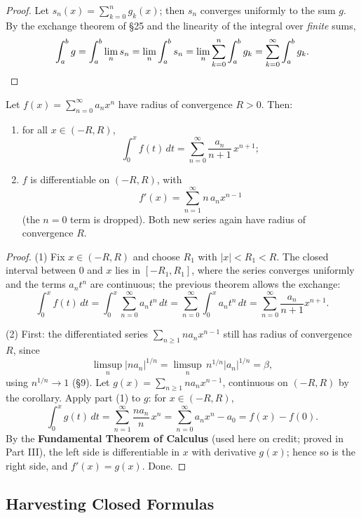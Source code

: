 \documentclass[11pt]{report}
\begin{document}
\begin{proof}
Let $s_n(x) = \sum_{k=0}^n g_k(x)$; then $s_n$ converges uniformly to the sum $g$. By the exchange theorem of \S 25 and the linearity of the integral over \emph{finite} sums,
\[
\int_a^b g = \int_a^b \lim_n s_n = \lim_n \int_a^b s_n = \lim_n \sum_{k=0}^n \int_a^b g_k = \sum_{k=0}^\infty \int_a^b g_k. \qedhere
\]
\end{proof}

\begin{thmbox}
Let $f(x) = \sum_{n=0}^\infty a_n x^n$ have radius of convergence $R > 0$. Then:
\begin{enumerate}[label=(\arabic*)]
    \item for all $x \in (-R, R)$,
    \[
    \int_0^x f(t)\,dt = \sum_{n=0}^\infty \frac{a_n}{n+1}\, x^{n+1};
    \]
    \item $f$ is differentiable on $(-R,R)$, with
    \[
    f'(x) = \sum_{n=1}^\infty n\, a_n x^{n-1}
    \]
    (the $n = 0$ term is dropped). Both new series again have radius of convergence $R$.
\end{enumerate}
\end{thmbox}

\begin{proof}
(1) Fix $x \in (-R,R)$ and choose $R_1$ with $|x| < R_1 < R$. The closed interval between $0$ and $x$ lies in $[-R_1, R_1]$, where the series converges uniformly and the terms $a_n t^n$ are continuous; the previous theorem allows the exchange:
\[
\int_0^x f(t)\,dt = \int_0^x \sum_{n=0}^\infty a_n t^n\,dt = \sum_{n=0}^\infty \int_0^x a_n t^n\,dt = \sum_{n=0}^\infty \frac{a_n}{n+1} x^{n+1}.
\]

(2) First: the differentiated series $\sum_{n\geq1} n a_n x^{n-1}$ still has radius of convergence $R$, since
\[
\limsup_n |n a_n|^{1/n} = \limsup_n\, n^{1/n} |a_n|^{1/n} = \beta,
\]
using $n^{1/n} \to 1$ (\S 9). Let $g(x) = \sum_{n\geq1} n a_n x^{n-1}$, continuous on $(-R,R)$ by the corollary. Apply part (1) to $g$: for $x \in (-R,R)$,
\[
\int_0^x g(t)\,dt = \sum_{n=1}^\infty \frac{n a_n}{n}\, x^{n} = \sum_{n=0}^\infty a_n x^n - a_0 = f(x) - f(0).
\]
By the \textbf{Fundamental Theorem of Calculus} (used here on credit; proved in Part III), the left side is differentiable in $x$ with derivative $g(x)$; hence so is the right side, and $f'(x) = g(x)$. Done.
\end{proof}

\subsection{Harvesting Closed Formulas}
\end{document}
